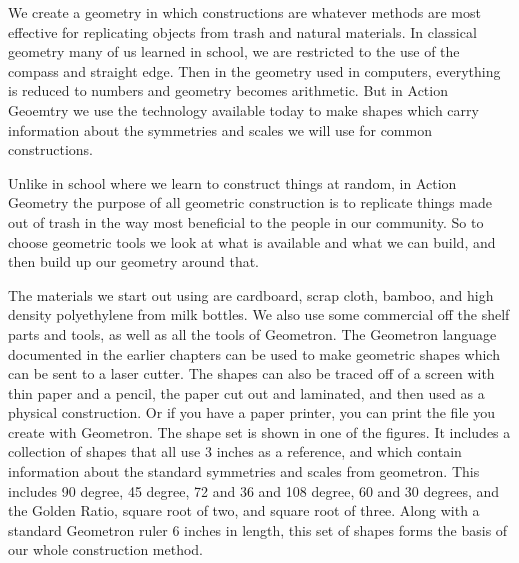 We create a geometry in which constructions are whatever methods are most effective for replicating objects from trash and natural materials.  In classical geometry many of us learned in school, we are restricted to the use of the compass and straight edge.  Then in the geometry used in computers, everything is reduced to numbers and geometry becomes arithmetic.  But in Action Geoemtry we use the technology available today to make shapes which carry information about the symmetries and scales we will use for common constructions.  

Unlike in school where we learn to construct things at random, in Action Geometry the purpose of all geometric construction is to replicate things made out of trash in the way most beneficial to the people in our community.  So to choose geometric tools we look at what is available and what we can build, and then build up our geometry around that.  

The materials we start out using are cardboard, scrap cloth, bamboo, and high density polyethylene from milk bottles.  We also use some commercial off the shelf parts and tools, as well as all the tools of Geometron.  The Geometron language documented in the earlier chapters can be used to make geometric shapes which can be sent to a laser cutter.  The shapes can also be traced off of a screen with thin paper and a pencil, the paper cut out and laminated, and then used as a physical construction.  Or if you have a paper printer, you can print the file you create with Geometron.   The shape set is shown in one of the figures.   It includes a collection of shapes that all use 3 inches as a reference, and which contain information about the standard symmetries and scales from geometron.  This includes 90 degree, 45 degree, 72 and 36 and 108 degree, 60 and 30 degrees, and the Golden Ratio, square root of two, and square root of three.  Along with a standard Geometron ruler 6 inches in length, this set of shapes forms the basis of our whole construction method. 

